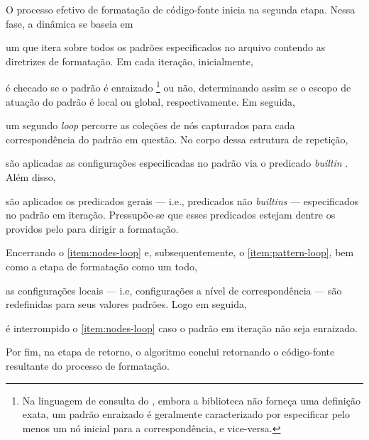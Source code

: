 \documentclass
  [11pt,a4paper,english,brazil,openright,sumario=tradicional,twoside]
  {abntex2}
\begin{document}
  O processo efetivo de formatação de código-fonte inicia na segunda etapa.
  Nessa fase, a dinâmica se baseia em
  \begin{inparaenum}
    \item \label{item:pattern-loop} um \textit{} que itera sobre
          todos os padrões especificados no arquivo contendo as diretrizes de
          formatação. Em cada iteração, inicialmente,
    \item é checado se o padrão é enraizado%
          \footnote
            { Na linguagem de consulta do \treesitter, embora a biblioteca não
              forneça uma definição exata, um padrão enraizado é geralmente
              caracterizado por especificar pelo menos um nó inicial para a
              correspondência, e vice-versa.}
          ou não, determinando assim se o escopo de atuação do padrão é local
          ou global, respectivamente. Em seguida,
    \item \label{item:nodes-loop} um segundo \textit{loop} percorre as coleções
          de nós capturados para cada correspondência do padrão em questão. No
          corpo dessa estrutura de repetição,
    \item são aplicadas as configurações especificadas no padrão via o
          predicado \textit{builtin} . Além disso,
    \item são aplicados os predicados gerais --- i.e., predicados não
          \textit{builtins} --- especificados no padrão em iteração.
          Pressupõe-se que esses predicados estejam dentre os providos pelo
          \witchcooking para dirigir a formatação.

          Encerrando o \cref{item:nodes-loop} e, subsequentemente, o
          \cref{item:pattern-loop}, bem como a etapa de formatação como um
          todo,
    \item as configurações locais --- i.e, configurações a nível de
          correspondência --- são redefinidas para seus valores padrões. Logo
          em seguida,
    \item é interrompido o \cref{item:nodes-loop} caso o padrão em iteração não
          seja enraizado.
  \end{inparaenum}
  Por fim, na etapa de retorno, o algoritmo conclui retornando o código-fonte
  resultante do processo de formatação.
\end{document}
